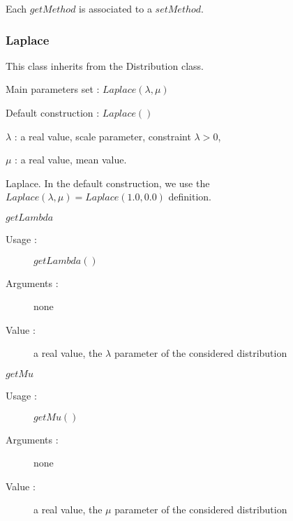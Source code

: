 Each  $getMethod$  is associated to a $setMethod$.




\newpage \subsubsection{Laplace}

This class inherits from the Distribution class.

\begin{description}

\item[Usage :]  \rule{0pt}{1em}
  \begin{description}
  \item Main parameters set : $Laplace(\lambda ,\mu)$
  \item Default construction : $Laplace( )$
  \end{description}

\item[Arguments :]  \rule{0pt}{1em}
  \begin{description}
  \item $\lambda$ :  a real value, scale parameter, constraint $\lambda>0$,
  \item $\mu$ : a real value, mean value.
  \end{description}

\item[Value :] Laplace. In the default construction, we use the $Laplace(\lambda, \mu) = Laplace(1.0, 0.0)$ definition.

\item[Some methods :] \rule{0pt}{1em}
  \begin{description}

  \item $getLambda$
    \begin{description}
    \item[Usage :] $getLambda()$
    \item[Arguments :] none
    \item[Value :]  a real value, the  $\lambda$ parameter of the considered distribution
    \end{description}
    \bigskip

  \item $getMu$
    \begin{description}
    \item[Usage :] $getMu()$
    \item[Arguments :] none
    \item[Value :]  a real value, the  $\mu$ parameter of the considered distribution
    \end{description}
    \bigskip
  \end{description}


\end{description}
